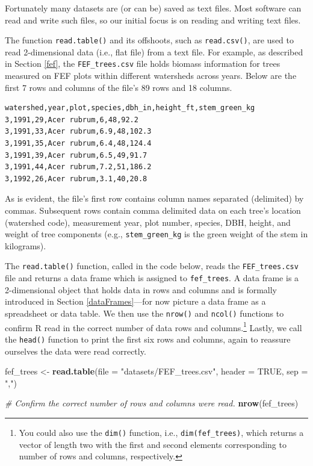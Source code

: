 \documentclass[
  11pt,
]{krantz}
\newenvironment{Shaded}{\begin{snugshade}}{\end{snugshade}}
\newcommand{\CommentTok}[1]{\textcolor[rgb]{0.56,0.35,0.01}{\textit{#1}}}
\newcommand{\DataTypeTok}[1]{\textcolor[rgb]{0.13,0.29,0.53}{#1}}
\newcommand{\KeywordTok}[1]{\textcolor[rgb]{0.13,0.29,0.53}{\textbf{#1}}}
\newcommand{\NormalTok}[1]{#1}
\newcommand{\OtherTok}[1]{\textcolor[rgb]{0.56,0.35,0.01}{#1}}
\newcommand{\StringTok}[1]{\textcolor[rgb]{0.31,0.60,0.02}{#1}}
\theoremstyle{definition}
\theoremstyle{definition}
\theoremstyle{definition}
\theoremstyle{definition}
\theoremstyle{remark}
\begin{document}
Fortunately many datasets are (or can be) saved as text files. Most software can read and write such files, so our initial focus is on reading and writing text files.

The function \texttt{read.table()} and its offshoots, such as \texttt{read.csv()}, are used to read 2-dimensional data (i.e., flat file) from a text file. For example, as described in Section \ref{fef}, the \texttt{FEF\_trees.csv} file holds biomass information for trees measured on FEF plots within different watersheds across years. Below are the first 7 rows and columns of the file's 89 rows and 18 columns.

\begin{verbatim}
watershed,year,plot,species,dbh_in,height_ft,stem_green_kg
3,1991,29,Acer rubrum,6,48,92.2
3,1991,33,Acer rubrum,6.9,48,102.3
3,1991,35,Acer rubrum,6.4,48,124.4
3,1991,39,Acer rubrum,6.5,49,91.7
3,1991,44,Acer rubrum,7.2,51,186.2
3,1992,26,Acer rubrum,3.1,40,20.8
\end{verbatim}

As is evident, the file's first row contains column names separated (delimited) by commas. Subsequent rows contain comma delimited data on each tree's location (watershed code), measurement year, plot number, species, DBH, height, and weight of tree components (e.g., \texttt{stem\_green\_kg} is the green weight of the stem in kilograms).

The \texttt{read.table()} function, called in the code below, reads the \texttt{FEF\_trees.csv} file and returns a data frame which is assigned to \texttt{fef\_trees}. A data frame is a 2-dimensional object that holds data in rows and columns and is formally introduced in Section \ref{dataFrames}---for now picture a data frame as a spreadsheet or data table. We then use the \texttt{nrow()} and \texttt{ncol()} functions to confirm R read in the correct number of data rows and columns.\footnote{You could also use the \texttt{dim()} function, i.e., \texttt{dim(fef\_trees)}, which returns a vector of length two with the first and second elements corresponding to number of rows and columns, respectively.} Lastly, we call the \texttt{head()} function to print the first six rows and columns, again to reassure ourselves the data were read correctly.

\begin{Shaded}
\begin{Highlighting}[]
\NormalTok{fef\_trees \textless{}{-}}\StringTok{ }\KeywordTok{read.table}\NormalTok{(}\DataTypeTok{file =} \StringTok{"datasets/FEF\_trees.csv"}\NormalTok{,}
                        \DataTypeTok{header =} \OtherTok{TRUE}\NormalTok{, }\DataTypeTok{sep =} \StringTok{","}\NormalTok{)}

\CommentTok{\# Confirm the correct number of rows and columns were read.}
\KeywordTok{nrow}\NormalTok{(fef\_trees)}
\end{Highlighting}
\end{Shaded}
\end{document}
